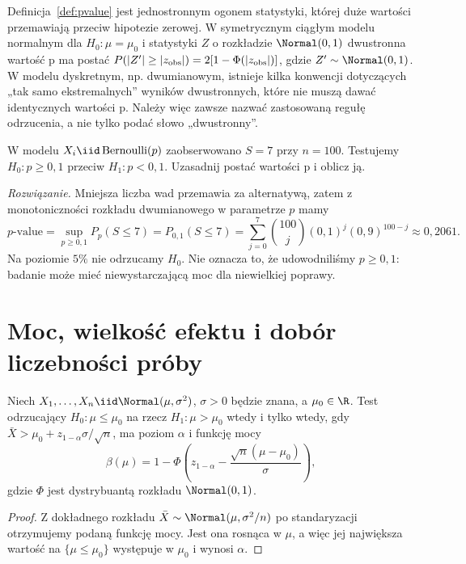 \begin{uwaga}
Definicja~\ref{def:pvalue} jest jednostronnym ogonem statystyki,
której duże wartości przemawiają przeciw hipotezie zerowej.
W symetrycznym ciągłym modelu normalnym dla
$H_0:\mu=\mu_0$ i statystyki $Z$ o rozkładzie
$\Normal(0,1)$ dwustronna wartość p ma postać
$P(|Z'|\ge|z_{\rm obs}|)=2[1-\Phi(|z_{\rm obs}|)]$,
gdzie $Z'\sim\Normal(0,1)$. W modelu dyskretnym,
np. dwumianowym, istnieje kilka konwencji dotyczących
„tak samo ekstremalnych” wyników dwustronnych, które
nie muszą dawać identycznych wartości p. Należy więc
zawsze nazwać zastosowaną regułę odrzucenia, a nie tylko
podać słowo „dwustronny”.
\end{uwaga}

\begin{zadanie}\label{zad:binom-test}
W modelu $X_i\iid\operatorname{Bernoulli}(p)$
zaobserwowano $S=7$ przy $n=100$. Testujemy
$H_0:p\ge0{,}1$ przeciw $H_1:p<0{,}1$.
Uzasadnij postać wartości p i oblicz ją.
\par\emph{Rozwiązanie.} Mniejsza liczba wad przemawia za
alternatywą, zatem z monotoniczności rozkładu dwumianowego
w parametrze $p$ mamy
\[
 p\text{-value}=\sup_{p\ge0{,}1}P_p(S\le7)
 =P_{0{,}1}(S\le7)
 =\sum_{j=0}^7\binom{100}{j}(0{,}1)^j(0{,}9)^{100-j}
 \approx0{,}2061.
\]
Na poziomie $5\%$ nie odrzucamy $H_0$. Nie oznacza to,
że udowodniliśmy $p\ge0{,}1$: badanie może mieć
niewystarczającą moc dla niewielkiej poprawy.
\end{zadanie}

\section{Moc, wielkość efektu i dobór liczebności próby}
\begin{twierdzenie}
\label{thm:normal-power}
Niech $X_1,\ldots,X_n\iid\Normal(\mu,\sigma^2)$,
$\sigma>0$ będzie znana, a $\mu_0\in\R$.
Test odrzucający $H_0:\mu\le\mu_0$ na rzecz
$H_1:\mu>\mu_0$ wtedy i tylko wtedy, gdy
$\bar X>\mu_0+z_{1-\alpha}\sigma/\sqrt n$, ma
poziom $\alpha$ i funkcję mocy
\[
 \beta(\mu)=1-\Phi\left(z_{1-\alpha}
 -\frac{\sqrt n(\mu-\mu_0)}{\sigma}\right),
\]
gdzie $\Phi$ jest dystrybuantą rozkładu $\Normal(0,1)$.
\end{twierdzenie}
\begin{proof}
Z dokładnego rozkładu $\bar X\sim\Normal(\mu,\sigma^2/n)$
po standaryzacji otrzymujemy podaną funkcję mocy.
Jest ona rosnąca w $\mu$, a więc jej największa wartość na
$\{\mu\le\mu_0\}$ występuje w $\mu_0$ i wynosi $\alpha$.
\end{proof}

